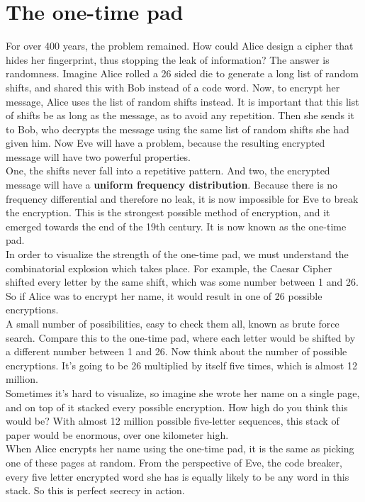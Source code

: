 \documentclass{report}
\begin{document}
 \section{The one-time pad}
 
 For over 400 years, the problem remained. How could Alice design a cipher that hides her fingerprint, thus stopping the leak of information?
 The answer is randomness. Imagine Alice rolled a 26 sided die to generate a long list of random shifts, and shared this with Bob instead of a code word. Now, to encrypt her message, Alice uses the list of random shifts instead. It is important that this list of shifts be as long as the message, as to avoid any repetition. Then she sends it to Bob, who decrypts the message using the same list of random shifts she had given him.
 Now Eve will have a problem, because the resulting encrypted message will have two powerful properties. \\
 One, the shifts never fall into a repetitive pattern. And two, the encrypted message will have a \textbf{uniform frequency distribution}. Because there is no frequency differential and therefore no leak, it is now impossible for Eve to break the encryption. This is the strongest possible method of encryption, and it emerged towards the end of the 19th century. It is now known as the one-time pad. \\
 In order to visualize the strength of the one-time pad, we must understand the combinatorial explosion which takes place. For example, the Caesar Cipher shifted every letter by the same shift, which was some number between 1 and 26. So if Alice was to encrypt her name, it would result in one of 26 possible encryptions. \\
 A small number of possibilities, easy to check them all, known as brute force search. Compare this to the one-time pad, where each letter would be shifted by a different number between 1 and 26. Now think about the number of possible encryptions. It's going to be 26 multiplied by itself five times, which is almost 12 million.\\
 Sometimes it's hard to visualize, so imagine she wrote her name on a single page, and on top of it stacked every possible encryption. How high do you think this would be? With almost 12 million possible five-letter sequences, this stack of paper would be enormous, over one kilometer high.\\
 When Alice encrypts her name using the one-time pad, it is the same as picking one of these pages at random. From the perspective of Eve, the code breaker, every five letter encrypted word she has is equally likely to be any word in this stack. So this is perfect secrecy in action.
 
\end{document}

